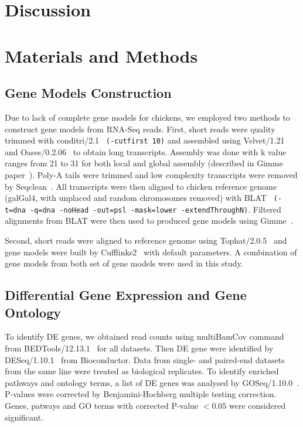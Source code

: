\documentclass[10pt]{article}
\begin{document}
\section*{Discussion}


\section*{Materials and Methods}
\subsection{Gene Models Construction}
Due to lack of complete gene models for chickens, we employed two methods to
construct gene models from RNA-Seq reads.
First, short reads were quality trimmed with conditri/2.1~\cite{} \texttt{(-cutfirst 10)}
and assembled using Velvet/1.21~\cite{} and Oases/0.2.06~\cite{} to obtain long transcripts.
Assembly was done with k value ranges from 21 to 31 for both local and global assembly
(described in Gimme paper~\cite{}).
Poly-A tails were trimmed and low complexity transcripts were removed by Seqclean~\cite{}.
All transcripts were then aligned to chicken reference genome (galGal4, with unplaced and random 
chromosomes removed) with BLAT~\cite{} \texttt{(-t=dna -q=dna -noHead -out=psl -mask=lower -extendThroughN)}.
Filtered alignments from BLAT were then used to produced gene models using Gimme~\cite{}.

Second, short reads were aligned to reference genome using Tophat/2.0.5~\cite{} and 
gene models were built by Cufflinks2~\cite{} with default parameters.
A combination of gene models from both set of gene models were used in this study.

\subsection{Differential Gene Expression and Gene Ontology}

To identify DE genes, we obtained read counts using multiBamCov command from BEDTools/12.13.1~\cite{}
for all datasets.
Then DE gene were identified by DESeq/1.10.1~\cite{S:2010fu} from Bioconductor.
Data from single- and paired-end datasets from the same line were treated as biological replicates.
To identify enriched pathways and ontology terms, a list of DE genes was analysed by GOSeq/1.10.0~\cite{}.
P-values were corrected by Benjamini-Hochberg multiple testing correction.
Genes, patways and GO terms with corrected P-value $<0.05$ were considered significant.
\end{document}
